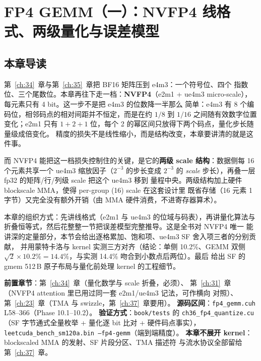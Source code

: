 \chapter{FP4 GEMM（一）：NVFP4 线格式、两级量化与误差模型}\label{ch:36}

\section{本章导读}

第~\ref{ch:34}~章与第~\ref{ch:35}~章把 BF16 矩阵压到 e4m3：一个符号位、四个
指数位、三个尾数位。本章再往下走一档：\textbf{NVFP4}（e2m1 + ue4m3
micro-scale），每元素只有 4 bit。这一步不是把 e4m3 的位数降一半那么
简单：e4m3 有 8 个编码位，相邻码点的相对间距并不恒定，而是在约 $1/8$ 到 $1/16$
之间随有效数字位置变化；e2m1 只有
$1+2+1$ 位，每个 2 的幂区间只放得下两个码点，量化步长随量级成倍变化。
精度的损失不是线性缩小，而是结构改变，本章要讲清的就是这件事。

而 NVFP4 能把这一档损失控制住的关键，是它的\textbf{两级 scale 结构}：数据侧每
16 个元素共享一个 ue4m3 缩放因子（$2^{-3}$ 的步长变成 $2^{-3}$ 的
\emph{scale} 步长），再叠一层 fp32 的矩阵/行/列级 scale 把这个 ue4m3 移到
量程中央。两级结构加上硬件 blockscale MMA，使得 per-group (16) scale 在这套设计里
既省存储（16 元素 1 字节）又完全没有额外开销（由 MMA 硬件消费，不进寄存器算术）。

本章的组织方式：先讲线格式（e2m1 与 ue4m3 的位域与码表），再讲量化算法与
折叠恒等式，然后花整整一节把误差模型完整推导。这是全书对 NVFP4 唯一
能讲深的定量部分，本节会给出逐格累加、饱和项、ue4m3 SF 舍入项三者的分别贡献，
并用蒙特卡洛与 kernel 实测三方对齐（结论：单侧 10.2\%、GEMM 双侧
$\sqrt{2}\times 10.2\% = 14.4\%$，与实测 14.4\% 吻合到小数点后两位）。最后
给出 SF 的 gmem 512\,B 原子布局与量化前处理 kernel 的工程细节。

\textbf{前置章节}：第~\ref{ch:34}~章（量化数学与 scale 折叠，必须）、
第~\ref{ch:31}~章（NVFP4 attention 里已用过同一套 e2m1/ue4m3 记法，可作横向
对照）、第~\ref{ch:23}~章（TMA 与 swizzle，第~\ref{ch:37}~章要用）。
\textbf{源码区间}：\texttt{fp4\_gemm.cuh} L58--366（Phase 10.1--10.2）。
\textbf{验证方式}：\texttt{book/tests} 的 \texttt{ch36\_fp4\_quantize.cu}
（SF 字节通式全量枚举 + 量化逐 bit 比对 + 硬件码点事实），
\texttt{leetcuda\_bench\_sm120a.bin --fp4-gemm}（端到端精度）。
\textbf{本章不展开 kernel}：blockscaled MMA 的发射、SF 片段分区、TMA 描述符
与流水协议全部留给第~\ref{ch:37}~章。

